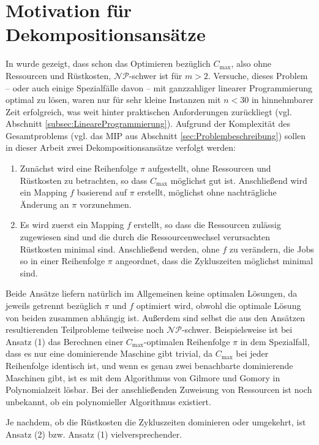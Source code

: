 \documentclass{scrreprt}
\begin{document}
\section{Motivation für Dekompositionsansätze}
In \cite{preprint} wurde gezeigt, dass schon das Optimieren bezüglich $C_{\max}$, also ohne Ressourcen und Rüstkosten, $\mathcal{NP}$-schwer ist für $m>2$.
Versuche, dieses Problem -- oder auch einige Spezialfälle davon -- mit ganzzahliger linearer Programmierung optimal zu lösen, waren nur für sehr kleine Instanzen mit
$n<30$ in hinnehmbarer Zeit erfolgreich, was weit hinter praktischen Anforderungen zurückliegt (vgl. Abschnitt \ref{subsec:LineareProgrammierung}).
Aufgrund der Komplexität des Gesamtproblems (vgl. das MIP aus Abschnitt \ref{sec:Problembeschreibung}) sollen in dieser Arbeit zwei Dekompositionsansätze verfolgt werden:
\begin{enumerate}
    \item Zunächst wird eine Reihenfolge $\pi$ aufgestellt, ohne Ressourcen und Rüstkosten zu betrachten, so dass $C_{\max}$ möglichst gut ist.
        Anschließend wird ein Mapping $f$ basierend auf $\pi$ erstellt, möglichst ohne nachträgliche Änderung an $\pi$ vorzunehmen.
    \item Es wird zuerst ein Mapping $f$ erstellt, so dass die Ressourcen zulässig zugewiesen sind und die durch die Ressourcenwechsel verursachten Rüstkosten minimal sind.
        Anschließend werden, ohne $f$ zu verändern, die Jobs so in einer Reihenfolge $\pi$ angeordnet, dass die Zykluszeiten möglichst minimal sind.
\end{enumerate}%
Beide Ansätze liefern natürlich im Allgemeinen keine optimalen Lösungen, da jeweils getrennt bezüglich $\pi$ und $f$ optimiert wird,
obwohl die optimale Lösung von beiden zusammen abhängig ist.
Außerdem sind selbst die aus den Ansätzen resultierenden Teilprobleme teilweise noch $\mathcal{NP}$-schwer.
Beispielsweise ist bei Ansatz (1) das Berechnen einer $C_{\max}$-optimalen Reihenfolge $\pi$ in dem Spezialfall,
dass es nur eine dominierende Maschine gibt trivial, da $C_{\max}$ bei jeder Reihenfolge identisch ist,
und wenn es genau zwei benachbarte dominierende Maschinen gibt,
ist es mit dem Algorithmus von Gilmore und Gomory \cite{gg} in Polynomialzeit lösbar.
Bei der anschließenden Zuweisung von Ressourcen ist noch unbekannt, ob ein polynomieller Algorithmus existiert.

Je nachdem, ob die Rüstkosten die Zykluszeiten dominieren oder umgekehrt, ist Ansatz (2) bzw. Ansatz (1) vielversprechender.
\end{document}
